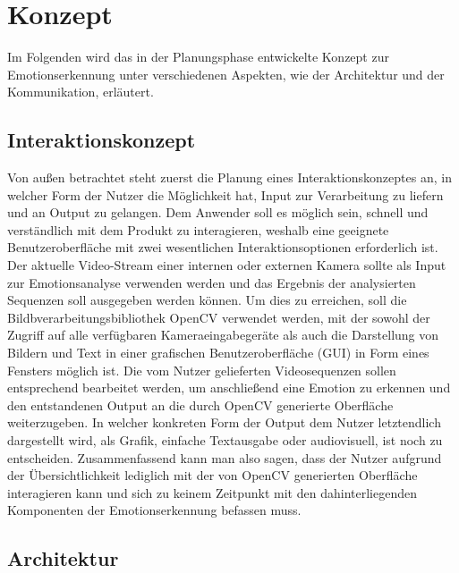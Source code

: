\documentclass[12pt, a4paper]{report}
\begin{document}
\section{Konzept}
Im Folgenden wird das in der Planungsphase entwickelte Konzept zur Emotionserkennung unter verschiedenen Aspekten, wie der Architektur und der Kommunikation, erläutert.

\subsection{Interaktionskonzept}
Von außen betrachtet steht zuerst die Planung eines Interaktionskonzeptes an, in welcher Form der Nutzer die Möglichkeit hat, Input zur Verarbeitung zu liefern und an Output zu gelangen. Dem Anwender soll es möglich sein, schnell und verständlich mit dem Produkt zu interagieren, weshalb eine geeignete Benutzeroberfläche mit zwei wesentlichen Interaktionsoptionen erforderlich ist. Der aktuelle Video-Stream einer internen oder externen Kamera sollte als Input zur Emotionsanalyse verwenden werden und das Ergebnis der analysierten Sequenzen soll ausgegeben werden können. Um dies zu erreichen, soll die Bildbverarbeitungsbibliothek OpenCV verwendet werden, mit der sowohl der Zugriff auf alle verfügbaren Kameraeingabegeräte als auch die Darstellung von Bildern und Text in einer grafischen Benutzeroberfläche (GUI) in Form eines Fensters möglich ist. Die vom Nutzer gelieferten Videosequenzen sollen entsprechend bearbeitet werden, um anschließend eine Emotion zu erkennen und den entstandenen Output an die durch OpenCV generierte Oberfläche weiterzugeben. In welcher konkreten Form der Output dem Nutzer letztendlich dargestellt wird, als Grafik, einfache Textausgabe oder audiovisuell, ist noch zu entscheiden.\newline
Zusammenfassend kann man also sagen, dass der Nutzer aufgrund der Übersichtlichkeit lediglich mit der von OpenCV generierten Oberfläche interagieren kann und sich zu keinem Zeitpunkt mit den dahinterliegenden Komponenten der Emotionserkennung befassen muss.\newline

\subsection{Architektur}
\end{document}
